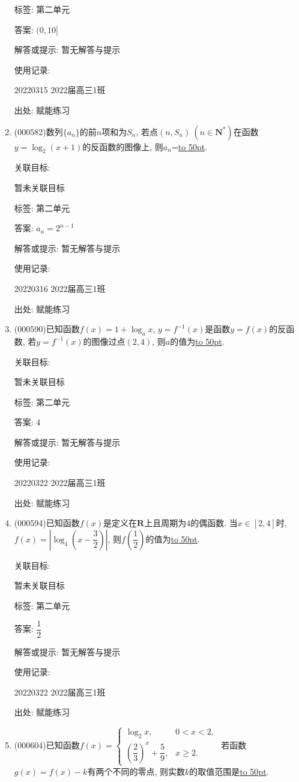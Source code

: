 \documentclass[10pt,a4paper]{article}
\newcommand{\blank}[1]{\underline{\hbox to #1pt{}}}
\begin{document}
\begin{enumerate}[1.]
标签: 第二单元

答案: $(0,10 ]$

解答或提示: 暂无解答与提示

使用记录:

20220315	2022届高三1班	


出处: 赋能练习
\item { (000582)}数列$\{a_n\}$的前$n$项和为$S_n$, 若点$(n,S_n) \ (n\in \mathbf{N}^*)$在函数$y=\log_2 (x+1)$的反函数的图像上, 则$a_n$=\blank{50}.


关联目标:

暂未关联目标



标签: 第二单元

答案: $a_n=2^{n-1}$

解答或提示: 暂无解答与提示

使用记录:

20220316	2022届高三1班	


出处: 赋能练习
\item { (000590)}已知函数$f(x)=1+\log_a x$, $y=f^{-1}(x)$是函数$y=f(x)$的反函数, 若$y=f^{-1}(x)$的图像过点$(2,4)$, 则$a$的值为\blank{50}.


关联目标:

暂未关联目标



标签: 第二单元

答案: $4$

解答或提示: 暂无解答与提示

使用记录:

20220322	2022届高三1班	


出处: 赋能练习
\item { (000594)}已知函数$f(x)$是定义在$\mathbf{R}$上且周期为$4$的偶函数. 当$x\in [2,4]$时, $f(x)=\left|\log_4(x-\dfrac32)\right|$, 则$f(\dfrac12)$的值为\blank{50}.


关联目标:

暂未关联目标



标签: 第二单元

答案: $\dfrac 12$

解答或提示: 暂无解答与提示

使用记录:

20220322	2022届高三1班	


出处: 赋能练习
\item { (000604)}已知函数$f(x)=\begin{cases} \log_2 x, & 0<x<2, \\ (\dfrac23)^x+\dfrac59, & x\ge 2. \end{cases}$ 若函数$g(x)=f(x)-k$有两个不同的零点, 则实数$k$的取值范围是\blank{50}.



\end{enumerate}
\end{document}
